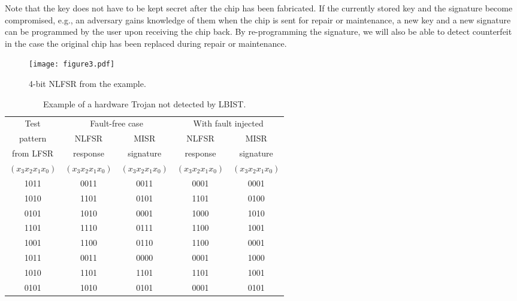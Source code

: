 \documentclass[a4paper]{llncs}
\begin{document}
Note that the key does not have to be kept secret after the chip has been fabricated. If the currently stored key and the signature become compromised, e.g., an adversary gains knowledge of them when the chip is sent for repair or maintenance, a new key and a new signature can be
programmed by the user upon receiving the chip back. By re-programming the signature, we will also be able to detect counterfeit in the case the original chip has been replaced during repair or maintenance.

\begin{figure}[t!]
\begin{center}
\texttt{[image: figure3.pdf]}
\caption{4-bit NLFSR from the example.}\label{f4} 
\end{center}
\end{figure}


\begin{table}[t!]
\begin{center}
\begin{tabular}{|c||c|c||c|c|}  \hline     
Test    & \multicolumn{2}{|c||}{Fault-free case} & \multicolumn{2}{c|}{With fault injected} \\ \cline{2-5}
pattern    & NLFSR         & MISR          & NLFSR         & MISR         \\ 
from LFSR    & response        & signature         & response        & signature         \\ 
$(x_3 x_2 x_1 x_0)$ & $(x_3 x_2 x_1 x_0)$ & $(x_3 x_2 x_1 x_0)$ & $(x_3 x_2 x_1 x_0)$ & $(x_3 x_2 x_1 x_0)$  \\
\hline
1011  & 0011  & 0011  & 0001  & 0001  \\
1010  & 1101  & 0101  & 1101  & 0100  \\
0101  & 1010  & 0001  & 1000  & 1010  \\
1101  & 1110  & 0111  & 1100  & 1001  \\
1001  & 1100  & 0110  & 1100  & 0001  \\
1011  & 0011  & 0000  & 0001  & 1000  \\
1010  & 1101  & 1101  & 1101  & 1001  \\
0101  & 1010  &  {\cellcolor[gray]{0.9}} 0101 & 0001  & \cellcolor[gray]{0.9} 0101  \\ \hline
\end{tabular}
\end{center}
\caption{Example of a hardware Trojan not detected by LBIST.} \label{t1}
\end{table}
\end{document}

